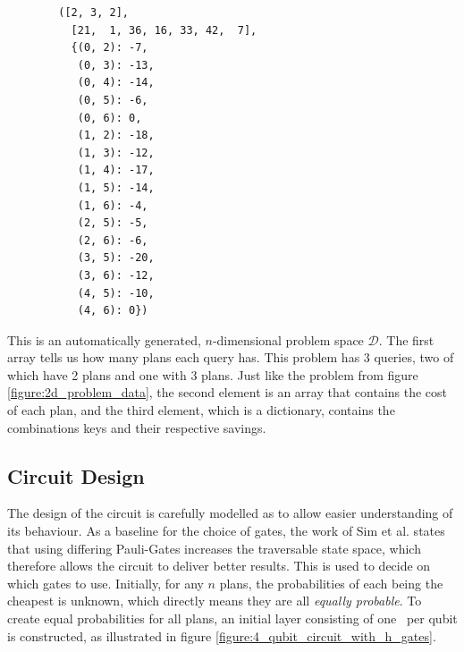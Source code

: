 \begin{listing}[!ht]
    \centering
    \begin{verbatim}
        ([2, 3, 2],
          [21,  1, 36, 16, 33, 42,  7],
          {(0, 2): -7,
           (0, 3): -13,
           (0, 4): -14,
           (0, 5): -6,
           (0, 6): 0,
           (1, 2): -18,
           (1, 3): -12,
           (1, 4): -17,
           (1, 5): -14,
           (1, 6): -4,
           (2, 5): -5,
           (2, 6): -6,
           (3, 5): -20,
           (3, 6): -12,
           (4, 5): -10,
           (4, 6): 0})
    \end{verbatim}
    \caption{This is an automatically generated, $n$-dimensional problem space $\mathcal{D}$. The first array tells us how many plans each query has. This problem has 3 queries, two of which have 2 plans and one with 3 plans. Just like the problem from figure \ref{figure:2d_problem_data}, the second element is an array that contains the cost of each plan, and the third element, which is a dictionary, contains the combinations keys and their respective savings.}
    \label{figure:nd_problem_data}
\end{listing}

\newpage

\subsection{Circuit Design}
\label{chapter:circuit_design}

The design of the circuit is carefully modelled as to allow easier understanding of its behaviour. As a baseline for the choice of gates, the work of Sim et al.\cite{sim_expressibility_2019} states that using differing Pauli-Gates increases the traversable state space, which therefore allows the circuit to deliver better results. This is used to decide on which gates to use. Initially, for any $n$ plans, the probabilities of each being the cheapest is unknown, which directly means they are all \emph{equally probable}. To create equal probabilities for all plans, an initial layer consisting of one \hgate\ per qubit is constructed, as illustrated in figure \ref{figure:4_qubit_circuit_with_h_gates}.

